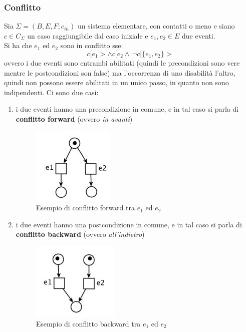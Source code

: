 \documentclass[a4paper,12pt, oneside]{book}
\begin{document}
\subsubsection{Conflitto}
\begin{definizione}
  Sia $\Sigma = (B,E,F;c_{in})$ un sistema elementare, con contatti o meno
  e siano $c\in C_\Sigma$ un caso raggiungibile dal caso iniziale e $e_1,e_2\in
  E$ due eventi.\\
  Si ha che $e_1$ ed $e_2$ sono in conflitto sse:
  \[c[e_1>\wedge c[e_2 \wedge\,\neg c[\{e_1,e_2\}>\]
  ovvero i due eventi sono entrambi abilitati (quindi le precondizioni sono vere
  mentre le postcondizioni son false) ma l'occorrenza di uno disabilità
  l'altro, quindi non possono essere abilitati in un unico passo, in quanto non
  sono indipendenti. Ci sono due casi:
  \begin{enumerate}
    \item i due eventi hanno una precondizione in comune, e in tal caso si parla
    di \textbf{conflitto forward} (ovvero \textit{in avanti})
    \begin{figure}[H]
      \centering
      \includegraphics[scale = 0.7]{img/conf1.jpg}
      \caption{Esempio di conflitto forward tra $e_1$ ed $e_2$}
    \end{figure}
    \item i due eventi hanno una postcondizione in comune, e in tal caso si parla
    di \textbf{conflitto backward} (ovvero \textit{all'indietro})
    \begin{figure}[H]
      \centering
      \includegraphics[scale = 0.7]{img/conf2.jpg}
      \caption{Esempio di conflitto backward tra $e_1$ ed $e_2$}
    \end{figure}
  \end{enumerate}

\end{definizione}
\end{document}
